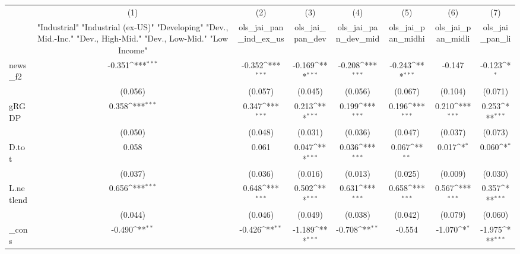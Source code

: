 {
\def\sym#1{\ifmmode^{#1}\else\(^{#1}\)\fi}
\begin{tabular}{l*{7}{c}}
\toprule
            &\multicolumn{1}{c}{(1)}&\multicolumn{1}{c}{(2)}&\multicolumn{1}{c}{(3)}&\multicolumn{1}{c}{(4)}&\multicolumn{1}{c}{(5)}&\multicolumn{1}{c}{(6)}&\multicolumn{1}{c}{(7)}\\
            &\multicolumn{1}{c}{ "Industrial" "Industrial (ex-US)" "Developing" "Dev., Mid.-Inc." "Dev., High-Mid."  "Dev., Low-Mid." "Low Income" }&\multicolumn{1}{c}{ols\_jai\_pan\_ind\_ex\_us}&\multicolumn{1}{c}{ols\_jai\_pan\_dev}&\multicolumn{1}{c}{ols\_jai\_pan\_dev\_mid}&\multicolumn{1}{c}{ols\_jai\_pan\_midhi}&\multicolumn{1}{c}{ols\_jai\_pan\_midli}&\multicolumn{1}{c}{ols\_jai\_pan\_li}\\
\midrule
news\_f2     &      -0.351\sym{***}&      -0.352\sym{***}&      -0.169\sym{***}&      -0.208\sym{***}&      -0.243\sym{***}&      -0.147         &      -0.123\sym{*}  \\
            &     (0.056)         &     (0.057)         &     (0.045)         &     (0.056)         &     (0.067)         &     (0.104)         &     (0.071)         \\
\addlinespace
gRGDP       &       0.358\sym{***}&       0.347\sym{***}&       0.213\sym{***}&       0.199\sym{***}&       0.196\sym{***}&       0.210\sym{***}&       0.253\sym{***}\\
            &     (0.050)         &     (0.048)         &     (0.031)         &     (0.036)         &     (0.047)         &     (0.037)         &     (0.073)         \\
\addlinespace
D.tot       &       0.058         &       0.061         &       0.047\sym{***}&       0.036\sym{***}&       0.067\sym{**} &       0.017\sym{*}  &       0.060\sym{*}  \\
            &     (0.037)         &     (0.036)         &     (0.016)         &     (0.013)         &     (0.025)         &     (0.009)         &     (0.030)         \\
\addlinespace
L.netlend   &       0.656\sym{***}&       0.648\sym{***}&       0.502\sym{***}&       0.631\sym{***}&       0.658\sym{***}&       0.567\sym{***}&       0.357\sym{***}\\
            &     (0.044)         &     (0.046)         &     (0.049)         &     (0.038)         &     (0.042)         &     (0.079)         &     (0.060)         \\
\addlinespace
\_cons      &      -0.490\sym{**} &      -0.426\sym{**} &      -1.189\sym{***}&      -0.708\sym{**} &      -0.554         &      -1.070\sym{*}  &      -1.975\sym{***}\\

\end{tabular}}
